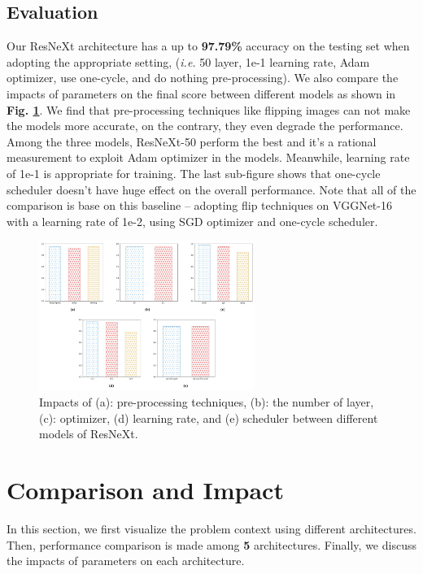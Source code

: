 \documentclass[10pt,twocolumn,letterpaper]{article}
\begin{document}
\subsection{Evaluation}

Our \textsf{ResNeXt} architecture has a up to \textbf{97.79\%} accuracy on the testing set when adopting the appropriate setting, (\textit{i.e.} 50 layer, 1e-1 learning rate, Adam optimizer, use one-cycle, and do nothing pre-processing). We also compare the impacts of parameters on the final score between different models as shown in \textbf{Fig. \ref{resxcompare}}. We find that pre-processing techniques like flipping images can not make the models more accurate, on the contrary, they even degrade the performance. Among the three models, \textsf{ResNeXt-50} perform the best and it's a rational measurement to exploit Adam optimizer in the models. Meanwhile, learning rate of 1e-1 is appropriate for training. The last sub-figure shows that one-cycle scheduler doesn't have huge effect on the overall performance. Note that all of the comparison is base on this baseline -- adopting flip techniques on \textsf{VGGNet-16} with a learning rate of 1e-2, using SGD optimizer and one-cycle scheduler.

\begin{figure}[h]
\centering
\includegraphics[width=7cm]{resX.pdf}
\caption{Impacts of (a): pre-processing techniques, (b): the number of layer, (c): optimizer, (d) learning rate, and (e) scheduler between different models of \textsf{ResNeXt}.}
\label{resxcompare}
\end{figure}


\section{Comparison and Impact} \label{SECCompare}

In this section, we first visualize the problem context using different architectures. Then, performance comparison is made among \textbf{5} architectures. Finally, we discuss the impacts of parameters on each architecture.
\end{document}
